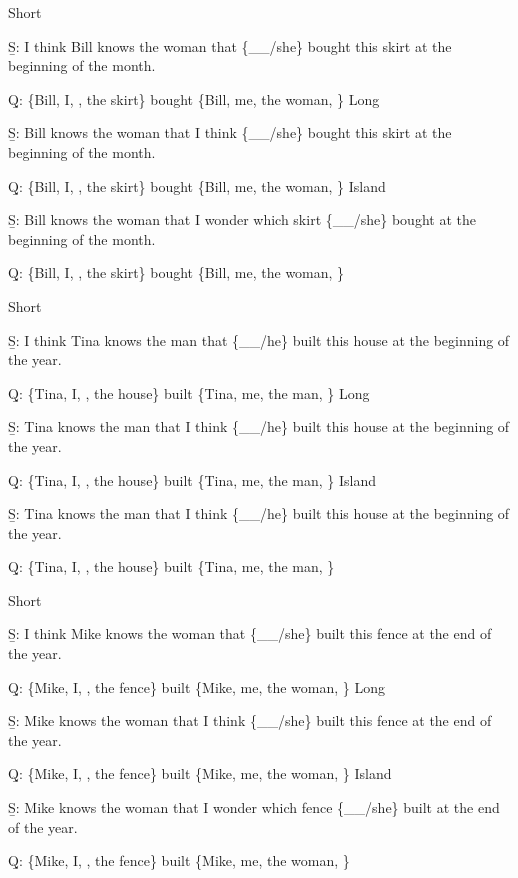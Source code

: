 \pex 
\a Short\par\nobreak
\beginsubsub 
\b{S:} I think Bill knows the woman that \{\_\_/she\} bought this skirt at the beginning of the month.\par\nobreak
\b{Q:} \{Bill, I, , the skirt\} bought \{Bill, me, the woman, \}
\endsubsub
\a Long\par\nobreak
\beginsubsub
\b{S:} Bill knows the woman that I think \{\_\_/she\} bought this skirt at the beginning of the month.\par\nobreak
\b{Q:} \{Bill, I, , the skirt\} bought \{Bill, me, the woman, \}
\endsubsub
\a Island\par\nobreak
\beginsubsub
\b{S:} Bill knows the woman that I wonder which skirt \{\_\_/she\} bought at the beginning of the month.\par\nobreak
\b{Q:} \{Bill, I, , the skirt\} bought \{Bill, me, the woman, \}
\endsubsub
\xe

\pex 
\a Short\par\nobreak
\beginsubsub 
\b{S:} I think Tina knows the man that \{\_\_/he\} built this house at the beginning of the year.\par\nobreak
\b{Q:} \{Tina, I, , the house\} built \{Tina, me, the man, \}
\endsubsub
\a Long\par\nobreak
\beginsubsub
\b{S:} Tina knows the man that I think \{\_\_/he\} built this house at the beginning of the year.\par\nobreak
\b{Q:} \{Tina, I, , the house\} built \{Tina, me, the man, \}
\endsubsub
\a Island\par\nobreak
\beginsubsub
\b{S:} Tina knows the man that I think \{\_\_/he\} built this house at the beginning of the year.\par\nobreak
\b{Q:} \{Tina, I, , the house\} built \{Tina, me, the man, \}
\endsubsub
\xe

\pex 
\a Short\par\nobreak
\beginsubsub 
\b{S:} I think Mike knows the woman that \{\_\_/she\} built this fence at the end of the year.\par\nobreak
\b{Q:} \{Mike, I, , the fence\} built \{Mike, me, the woman, \}
\endsubsub
\a Long\par\nobreak
\beginsubsub
\b{S:} Mike knows the woman that I think \{\_\_/she\} built this fence at the end of the year.\par\nobreak
\b{Q:} \{Mike, I, , the fence\} built \{Mike, me, the woman, \}
\endsubsub
\a Island\par\nobreak
\beginsubsub
\b{S:} Mike knows the woman that I wonder which fence \{\_\_/she\} built at the end of the year.\par\nobreak
\b{Q:} \{Mike, I, , the fence\} built \{Mike, me, the woman, \}
\endsubsub
\xe

